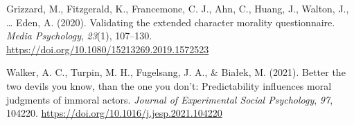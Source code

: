 \documentclass[
  man,floatsintext]{apa6}
\newlength{\cslhangindent}
\newenvironment{CSLReferences}[2] %
 {\begin{list}{}{%
  \setlength{\itemindent}{0pt}
  \setlength{\leftmargin}{0pt}
  \setlength{\parsep}{0pt}
  \ifodd #1
   \setlength{\leftmargin}{\cslhangindent}
   \setlength{\itemindent}{-1\cslhangindent}
  \fi
  \setlength{\itemsep}{#2\baselineskip}}}
 {\end{list}}
\begin{document}
\label{refs}
\begin{CSLReferences}{1}{0}
Grizzard, M., Fitzgerald, K., Francemone, C. J., Ahn, C., Huang, J., Walton, J., \ldots{} Eden, A. (2020). Validating the extended character morality questionnaire. \emph{Media Psychology}, \emph{23}(1), 107--130. \url{https://doi.org/10.1080/15213269.2019.1572523}

Walker, A. C., Turpin, M. H., Fugelsang, J. A., \& Białek, M. (2021). Better the two devils you know, than the one you don't: {Predictability} influences moral judgments of immoral actors. \emph{Journal of Experimental Social Psychology}, \emph{97}, 104220. \url{https://doi.org/10.1016/j.jesp.2021.104220}

\end{CSLReferences}
\end{document}
